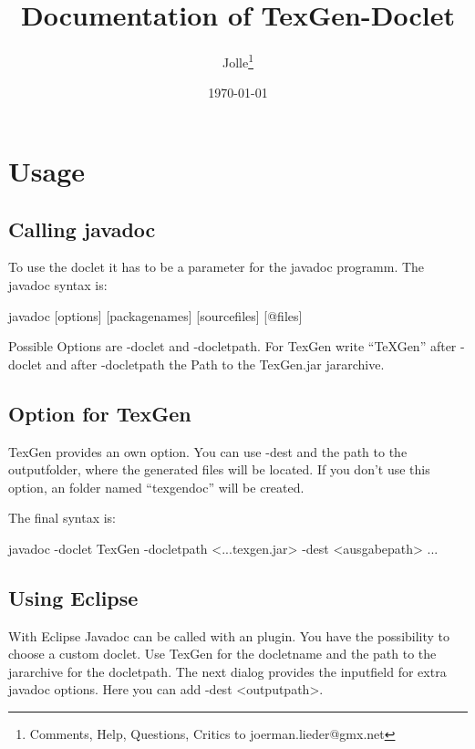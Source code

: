 \documentclass{article}
\author{Jolle\footnote{Comments, Help, Questions, Critics to \mbox{joerman.lieder@gmx.net}}  }
\date{\today}
\title{Documentation of TexGen-Doclet}
\begin{document}
\maketitle


\tableofcontents

\section{Usage}
\subsection{Calling javadoc}
To use the doclet it has to be a parameter for the javadoc programm. The javadoc syntax is:

javadoc [options] [packagenames] [sourcefiles] [@files]

Possible Options are -doclet and -docletpath. For TexGen write \enquote{TeXGen} after -doclet and after -docletpath the Path to the TexGen.jar jararchive.

\subsection{Option for TexGen}
TexGen provides an own option. You can use -dest and the path to the outputfolder, where the generated files will be located. If you don't use this option, an folder named \enquote{texgendoc} will be created.

The final syntax is:

javadoc -doclet TexGen -docletpath <...texgen.jar> -dest <ausgabepath>  ...

\subsection{Using Eclipse}
With Eclipse Javadoc can be called with an plugin. You have the possibility to choose a custom doclet. Use TexGen for the docletname and the path to the jararchive for the docletpath. The next dialog provides the inputfield for extra javadoc options. Here you can add -dest <outputpath>.
\end{document}

